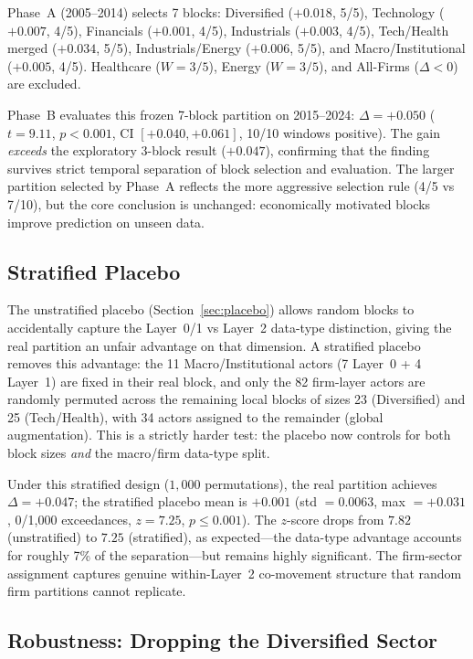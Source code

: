 \documentclass[11pt,a4paper]{article}
\begin{document}
Phase~A (2005--2014) selects 7 blocks: Diversified ($+0.018$, 5/5), Technology ($+0.007$, 4/5), Financials ($+0.001$, 4/5), Industrials ($+0.003$, 4/5), Tech/Health merged ($+0.034$, 5/5), Industrials/Energy ($+0.006$, 5/5), and Macro/Institutional ($+0.005$, 4/5). Healthcare ($W = 3/5$), Energy ($W = 3/5$), and All-Firms ($\Delta < 0$) are excluded.

Phase~B evaluates this frozen 7-block partition on 2015--2024: $\Delta = +0.050$ ($t = 9.11$, $p < 0.001$, CI $[+0.040, +0.061]$, 10/10 windows positive). The gain \emph{exceeds} the exploratory 3-block result ($+0.047$), confirming that the finding survives strict temporal separation of block selection and evaluation. The larger partition selected by Phase~A reflects the more aggressive selection rule (4/5 vs 7/10), but the core conclusion is unchanged: economically motivated blocks improve prediction on unseen data.

\subsection{Stratified Placebo}
\label{sec:strat_placebo}

The unstratified placebo (Section~\ref{sec:placebo}) allows random blocks to accidentally capture the Layer~0/1 vs Layer~2 data-type distinction, giving the real partition an unfair advantage on that dimension. A stratified placebo removes this advantage: the 11 Macro/Institutional actors (7 Layer~0 + 4 Layer~1) are fixed in their real block, and only the 82 firm-layer actors are randomly permuted across the remaining local blocks of sizes 23 (Diversified) and 25 (Tech/Health), with 34 actors assigned to the remainder (global augmentation). This is a strictly harder test: the placebo now controls for both block sizes \emph{and} the macro/firm data-type split.

Under this stratified design ($1{,}000$ permutations), the real partition achieves $\Delta = +0.047$; the stratified placebo mean is $+0.001$ (std $= 0.0063$, max $= +0.031$, 0/1{,}000 exceedances, $z = 7.25$, $p \leq 0.001$). The $z$-score drops from $7.82$ (unstratified) to $7.25$ (stratified), as expected---the data-type advantage accounts for roughly 7\% of the separation---but remains highly significant. The firm-sector assignment captures genuine within-Layer~2 co-movement structure that random firm partitions cannot replicate.

\subsection{Robustness: Dropping the Diversified Sector}
\end{document}

